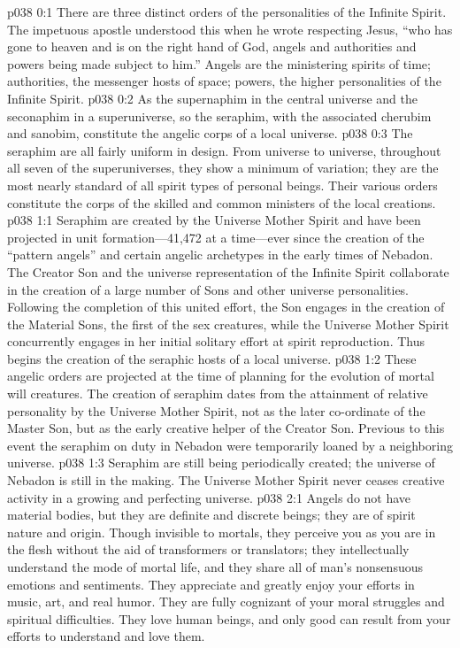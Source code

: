 \author{Melchizedek}
\vs p038 0:1 There are three distinct orders of the personalities of the Infinite Spirit. The impetuous apostle understood this when he wrote respecting Jesus, “who has gone to heaven and is on the right hand of God, angels and authorities and powers being made subject to him.” Angels are the ministering spirits of time; authorities, the messenger hosts of space; powers, the higher personalities of the Infinite Spirit.
\pc \vs p038 0:2 As the supernaphim in the central universe and the seconaphim in a superuniverse, so the seraphim, with the associated cherubim and sanobim, constitute the angelic corps of a local universe.
\vs p038 0:3 The seraphim are all fairly uniform in design. From universe to universe, throughout all seven of the superuniverses, they show a minimum of variation; they are the most nearly standard of all spirit types of personal beings. Their various orders constitute the corps of the skilled and common ministers of the local creations.
\vs p038 1:1 Seraphim are created by the Universe Mother Spirit and have been projected in unit formation---41,472 at a time---ever since the creation of the “pattern angels” and certain angelic archetypes in the early times of Nebadon. The Creator Son and the universe representation of the Infinite Spirit collaborate in the creation of a large number of Sons and other universe personalities. Following the completion of this united effort, the Son engages in the creation of the Material Sons, the first of the sex creatures, while the Universe Mother Spirit concurrently engages in her initial solitary effort at spirit reproduction. Thus begins the creation of the seraphic hosts of a local universe.
\vs p038 1:2 These angelic orders are projected at the time of planning for the evolution of mortal will creatures. The creation of seraphim dates from the attainment of relative personality by the Universe Mother Spirit, not as the later co\hyp{}ordinate of the Master Son, but as the early creative helper of the Creator Son. Previous to this event the seraphim on duty in Nebadon were temporarily loaned by a neighboring universe.\plusone
\vs p038 1:3 Seraphim are still being periodically created; the universe of Nebadon is still in the making. The Universe Mother Spirit never ceases creative activity in a growing and perfecting universe.
\vs p038 2:1 Angels do not have material bodies, but they are definite and discrete beings; they are of spirit nature and origin. Though invisible to mortals, they perceive you as you are in the flesh without the aid of transformers or translators; they intellectually understand the mode of mortal life, and they share all of man’s nonsensuous emotions and sentiments. They appreciate and greatly enjoy your efforts in music, art, and real humor. They are fully cognizant of your moral struggles and spiritual difficulties. They love human beings, and only good can result from your efforts to understand and love them.
